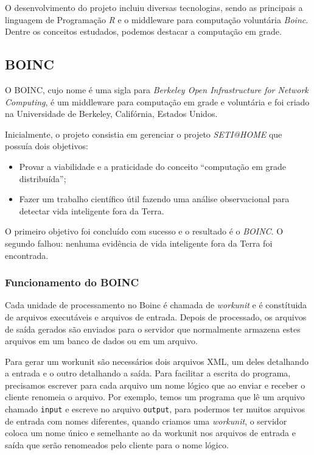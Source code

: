 O desenvolvimento do projeto incluiu diversas tecnologias, sendo as principais a linguagem de Programação \emph{R} e o middleware
para computação voluntária \emph{Boinc}. Dentre os conceitos estudados, podemos destacar a computação em grade.  

\subsection{BOINC}


O BOINC, cujo nome é uma sigla para \textit{Berkeley Open Infrastructure for Network Computing}, é um middleware 
para computação em grade e voluntária e foi criado na Universidade de Berkeley, Califórnia, Estados Unidos.

Inicialmente, o projeto consistia em gerenciar o projeto \textit{SETI@HOME} que possuía dois objetivos:

\begin{itemize}
	\item Provar a viabilidade e a praticidade do conceito ``computação em grade distribuída'';
	\item Fazer um trabalho científico útil fazendo uma análise observacional para detectar vida inteligente fora da Terra.
\end{itemize}

O primeiro objetivo foi concluído com sucesso e o resultado é o \textit{BOINC}. O segundo falhou: nenhuma evidência de 
vida inteligente fora da Terra foi encontrada. 

\subsubsection{Funcionamento do BOINC}

Cada unidade de processamento no Boinc é chamada de \emph{workunit} e é constítuida de arquivos executáveis e 
arquivos de entrada. Depois de processado, os arquivos de saída gerados são enviados para o servidor que
normalmente armazena estes arquivos em um banco de dados ou em um arquivo.

Para gerar um workunit são necessários dois arquivos XML, um deles detalhando a entrada e o 
outro detalhando a saída. Para facilitar a escrita do programa, precisamos escrever para cada arquivo um nome lógico 
que ao enviar e receber o cliente renomeia o arquivo. Por exemplo, temos um programa que lê um arquivo chamado 
\verb#input# e escreve no arquivo \verb#output#, para podermos ter muitos arquivos de entrada com nomes diferentes, quando
criamos uma \emph{workunit}, o servidor coloca um nome único e semelhante ao da workunit nos arquivos de entrada e saída que serão renomeados
pelo cliente para o nome lógico.

